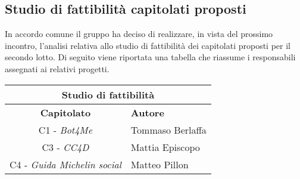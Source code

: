     \newpage
    \subsection {Studio di fattibilità capitolati proposti}
    In accordo comune il gruppo ha deciso di realizzare, in vista del prossimo incontro, l'analisi relativa allo studio di fattibilità dei capitolati proposti per il secondo lotto. Di seguito viene riportata una tabella che riassume i responsabili assegnati ai relativi progetti.  
    \vspace{1em} 

    \renewcommand{\arraystretch}{1.8} %
    \begin{center}
    \begin{tabular}{ |c|l| }
        \hline \multicolumn{2}{|c|}{\textbf{Studio di fattibilità }} \\
        \hline
        \textbf{Capitolato} & \textbf{Autore} \\
        \hline
        C1 - \textit{Bot4Me} & Tommaso Berlaffa\\
        \hline
        C3 - \textit{CC4D} & Mattia Episcopo\\
        \hline
        C4 - \textit{Guida Michelin social }& Matteo Pillon\\
        \hline
    \end{tabular}
    \end{center}